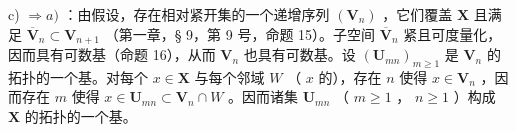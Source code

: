 c) \(\Longrightarrow a)\) ：由假设，存在相对紧开集的一个递增序列 \((\mathbf{V}_n)\) ，它们覆盖 \(\mathbf{X}\) 且满足 \(\overline{\mathbf{V}}_n \subset \mathbf{V}_{n+1}\) （第一章，§ 9，第 9 号，命题 15）。子空间 \(\overline{\mathbf{V}}_n\) 紧且可度量化，因而具有可数基（命题 16），从而 \(\mathbf{V}_n\) 也具有可数基。设 \((\mathbf{U}_{mn})_{m \geqslant 1}\) 是 \(\mathbf{V}_n\) 的拓扑的一个基。对每个 \(x \in \mathbf{X}\) 与每个邻域 \(W\) （ \(x\) 的），存在 \(n\) 使得 \(x \in \mathbf{V}_n\) ，因而存在 \(m\) 使得 \(x \in \mathbf{U}_{mn} \subset \mathbf{V}_n \cap W\) 。因而诸集 \(\mathbf{U}_{mn}\) （ \(m \geqslant 1\) ， \(n \geqslant 1\) ）构成 \(\mathbf{X}\) 的拓扑的一个基。
